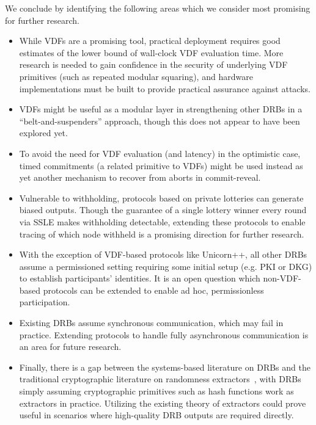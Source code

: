 We conclude by identifying the following areas which we consider most promising for further research.
\begin{itemize}
    \item While VDFs are a promising tool, practical deployment requires good estimates of the lower bound of wall-clock VDF evaluation time. More research is needed to gain confidence in the security of underlying VDF primitives (such as repeated modular squaring), and hardware implementations must be built to provide practical assurance against attacks.
    \item VDFs might be useful as a modular layer in strengthening other DRBs in a ``belt-and-suspenders'' approach, though this does not appear to have been explored yet.
    \item To avoid the need for VDF evaluation (and latency) in the optimistic case, timed commitments (a related primitive to VDFs) might be used instead as yet another mechanism to recover from aborts in commit-reveal.
    \item Vulnerable to withholding, protocols based on private lotteries can generate biased outputs. Though the guarantee of a single lottery winner every round via SSLE makes withholding detectable, extending these protocols to enable tracing of which node withheld is a promising direction for further research.
    \item With the exception of VDF-based protocols like Unicorn++, all other DRBs assume a permissioned setting requiring some initial setup (e.g. PKI or DKG) to establish participants' identities. It is an open question which non-VDF-based protocols can be extended to enable ad hoc, permissionless participation.
    \item Existing DRBs assume synchronous communication, which may fail in practice. Extending protocols to handle fully asynchronous communication is an area for future research.
    \item Finally, there is a gap between the systems-based literature on DRBs and the traditional cryptographic literature on randomness extractors~\cite{trevisan2000extracting,trevisan2001extractors}, with DRBs simply assuming cryptographic primitives such as hash functions work as extractors in practice. Utilizing the existing theory of extractors could prove useful in scenarios where high-quality DRB outputs are required directly.
\end{itemize}